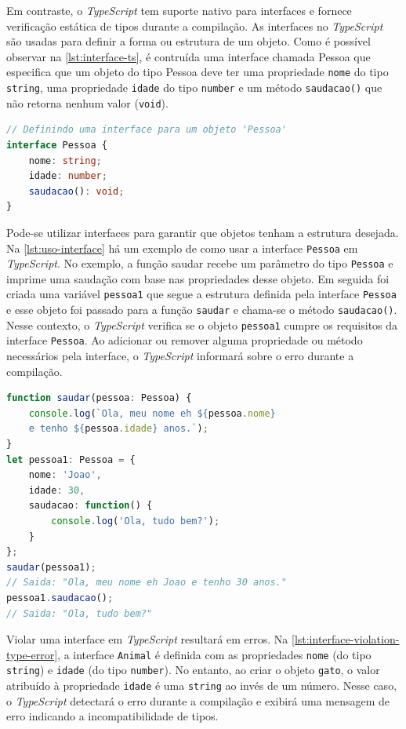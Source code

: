 Em contraste, o \textit{TypeScript} tem suporte nativo para interfaces e fornece verificação estática de tipos durante a compilação. As interfaces no \textit{TypeScript} são usadas para definir a forma ou estrutura de um objeto. Como é possível observar na \autoref{lst:interface-ts}, é contruída uma interface chamada Pessoa que especifica que um objeto do tipo Pessoa deve ter uma propriedade \texttt{nome} do tipo \texttt{string}, uma propriedade \texttt{idade} do tipo \texttt{number} e um método \texttt{saudacao()} que não retorna nenhum valor (\texttt{void}).

\begin{lstlisting}[language=TypeScript, caption=Exemplo de Interface em TS., label=lst:interface-ts]
// Definindo uma interface para um objeto 'Pessoa'
interface Pessoa {
    nome: string;
    idade: number;
    saudacao(): void;
}
\end{lstlisting}



Pode-se utilizar interfaces para garantir que objetos tenham a estrutura desejada. Na \autoref{lst:uso-interface} há um exemplo de como usar a interface \texttt{Pessoa} em \textit{TypeScript}. No exemplo, a função saudar recebe um parâmetro do tipo \texttt{Pessoa} e imprime uma saudação com base nas propriedades desse objeto. Em seguida foi criada uma variável \texttt{pessoa1} que segue a estrutura definida pela interface \texttt{Pessoa} e esse objeto foi passado para a função \texttt{saudar} e chama-se o método \texttt{saudacao()}. Nesse contexto, o \textit{TypeScript} verifica se o objeto \texttt{pessoa1} cumpre os requisitos da interface \texttt{Pessoa}. Ao adicionar ou remover alguma propriedade ou método necessários pela interface, o \textit{TypeScript} informará sobre o erro durante a compilação.



\begin{lstlisting}[language=TypeScript, caption=Utilização de Interfaces em TS., label=lst:uso-interface]
function saudar(pessoa: Pessoa) {
    console.log(`Ola, meu nome eh ${pessoa.nome} 
    e tenho ${pessoa.idade} anos.`);
}
let pessoa1: Pessoa = {
    nome: 'Joao',
    idade: 30,
    saudacao: function() {
        console.log('Ola, tudo bem?');
    }
};
saudar(pessoa1); 
// Saida: "Ola, meu nome eh Joao e tenho 30 anos."
pessoa1.saudacao(); 
// Saida: "Ola, tudo bem?"
\end{lstlisting}


Violar uma interface em \textit{TypeScript} resultará em erros. Na \autoref{lst:interface-violation-type-error}, a interface \texttt{Animal} é definida com as propriedades \texttt{nome} (do tipo \texttt{string}) e \texttt{idade} (do tipo \texttt{number}). No entanto, ao criar o objeto \texttt{gato}, o valor atribuído à propriedade \texttt{idade} é uma \texttt{string} ao invés de um número. Nesse caso, o \textit{TypeScript} detectará o erro durante a compilação e exibirá uma mensagem de erro indicando a incompatibilidade de tipos.




